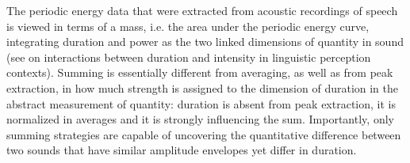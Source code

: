 \begin{sloppypar}
The periodic energy data that were extracted from acoustic recordings of speech is viewed in terms of a mass, i.e. the area under the periodic energy curve, integrating duration and power as the two linked dimensions of quantity in sound (see \citealt{turk1996processing} on interactions between duration and intensity in linguistic perception contexts). 
Summing is essentially different from averaging, as well as from peak extraction, 
in how much strength is assigned to the dimension of duration in the abstract measurement of quantity: duration is absent from peak extraction, it is normalized in averages and it is strongly influencing the sum.
Importantly, only summing strategies are capable of uncovering the quantitative difference between two sounds that have similar amplitude envelopes yet differ in duration. 
\end{sloppypar}

